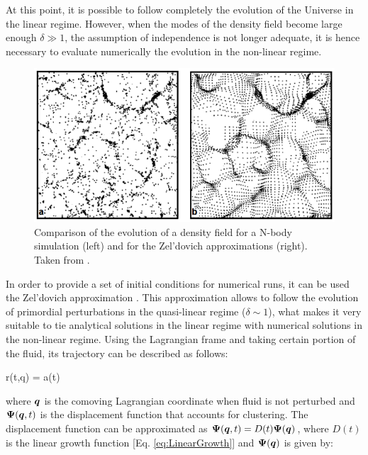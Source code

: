 \documentclass[a4,useAMS,usenatbib,usegraphicx,12pt]{article}
\begin{document}
At this point, it is possible to follow completely the evolution of the Universe
in the linear regime. However, when the modes of the density field become large
enough $\delta\gg 1$, the assumption of independence is not longer adequate, it 
is hence necessary to evaluate numerically the evolution in the non-linear 
regime.

\begin{figure}[h]
\centering

  \includegraphics[trim = 0mm 0mm 0mm 2mm, clip, keepaspectratio=true,
  width=0.4\textheight]{./figures/Zeldovich_Approximation.png}
  
  \caption{\small Comparison of the evolution of a density field for a 
  N-body simulation (left) and for the Zel'dovich approximations (right).
  Taken from \cite{longair2008}.}

  \label{fig:Zeldovich}

\end{figure}

In order to provide a set of initial conditions for numerical runs, it can be 
used the Zel'dovich approximation \citep{Zeldovich70}. This approximation allows
to follow the evolution of primordial perturbations in the quasi-linear regime 
($\delta \sim 1$), what makes it very suitable to tie analytical solutions in 
the linear regime with numerical solutions in the non-linear regime. Using the
Lagrangian frame and taking certain portion of the fluid, its trajectory can 
be described as follows:

{ \bds r(t,\bds q) = a(t) }

where $\boldsymbol{ q }$ is the comoving Lagrangian coordinate when fluid is not 
perturbed and $\boldsymbol{ \Psi }(\boldsymbol{ q }, t)$ is the displacement function that 
accounts for clustering. The displacement function can be approximated as 
$\boldsymbol{ \Psi }(\boldsymbol{ q }, t) = D(t)\boldsymbol{ \Psi }(\boldsymbol{ q })$, where $D(t)$ is the linear 
growth function [Eq. \ref{eq:LinearGrowth}] and $\boldsymbol{ \Psi }(\boldsymbol{ q })$ is given 
by:
\end{document}
